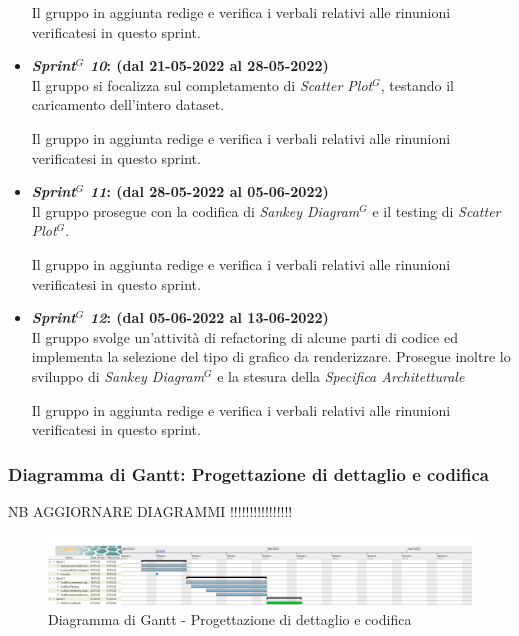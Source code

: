 \begin{itemize}
    Il gruppo in aggiunta redige e verifica i verbali relativi alle rinunioni verificatesi in questo sprint.
    \item \textbf{\textit{Sprint$^G$  10}: (dal 21-05-2022 al 28-05-2022)}\\
    Il gruppo si focalizza sul completamento di \textit{Scatter Plot}$^G$, testando il caricamento dell'intero dataset. 

    Il gruppo in aggiunta redige e verifica i verbali relativi alle rinunioni verificatesi in questo sprint.

    \item \textbf{\textit{Sprint$^G$  11}: (dal 28-05-2022 al 05-06-2022)}\\
    Il gruppo prosegue con la codifica di \textit{Sankey Diagram}$^G$ e il testing di \textit{Scatter Plot}$^G$. 
    
    Il gruppo in aggiunta redige e verifica i verbali relativi alle rinunioni verificatesi in questo sprint.

    \item \textbf{\textit{Sprint$^G$  12}: (dal 05-06-2022 al 13-06-2022)}\\
    Il gruppo svolge un'attività di refactoring di alcune parti di codice ed implementa la selezione del tipo di grafico da renderizzare.
    Prosegue inoltre lo sviluppo di \textit{Sankey Diagram}$^G$ e la stesura della \textit{Specifica Architetturale}
    
    Il gruppo in aggiunta redige e verifica i verbali relativi alle rinunioni verificatesi in questo sprint.

\end{itemize}

\subsubsection{Diagramma di Gantt: Progettazione di dettaglio e codifica}
NB AGGIORNARE DIAGRAMMI !!!!!!!!!!!!!!!!
\begin{figure}[h!]
    \centering
    \includegraphics[scale=0.22]{../../assets/Diagrammi_Gantt/TB.png}
    \caption{Diagramma di Gantt - Progettazione di dettaglio e codifica}
\end{figure}